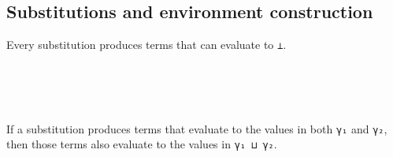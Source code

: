 \hypertarget{substitutions-and-environment-construction}{%
\subsection{Substitutions and environment
construction}\label{substitutions-and-environment-construction}}

Every substitution produces terms that can evaluate to \texttt{⊥}.

\begin{fence}
\begin{code}%
\>[0]\AgdaSpace{}%
\AgdaSymbol{:}\AgdaSpace{}%
\AgdaSpace{}%
\AgdaSymbol{\}\{}\AgdaSpace{}%
\AgdaSymbol{:}\AgdaSpace{}%
\AgdaSpace{}%
\AgdaSymbol{\}\{}\AgdaSpace{}%
\AgdaSymbol{:}\AgdaSpace{}%
\AgdaSpace{}%
\AgdaSpace{}%
\AgdaSymbol{\}}\<%
\\
\>[0][@{}l@{\AgdaIndent{0}}]%
\>[4]\AgdaComment{-----------------}\<%
\\
\>[0][@{}l@{\AgdaIndent{0}}]%
\>[2]\AgdaSpace{}%
\AgdaSpace{}%
\AgdaSpace{}%
\AgdaSpace{}%
\AgdaSpace{}%
\<%
\\
\>[0]\AgdaSpace{}%
\AgdaSpace{}%
\AgdaSymbol{=}\AgdaSpace{}%
\<%
\end{code}
\end{fence}

If a substitution produces terms that evaluate to the values in both
\texttt{γ₁} and \texttt{γ₂}, then those terms also evaluate to the
values in \texttt{γ₁\ ⊔\ γ₂}.

